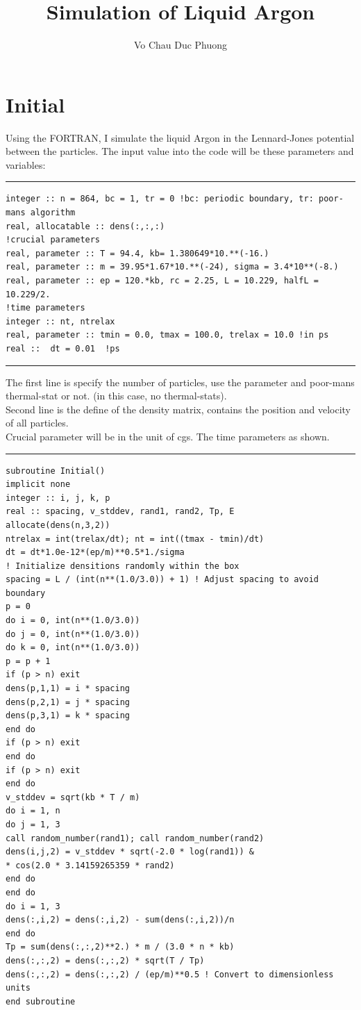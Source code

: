 \documentclass[a4paper]{article}
\author{Vo Chau Duc Phuong}
\title{Simulation of Liquid Argon}
\begin{document}
	\maketitle
\tableofcontents
\section{Initial}
\quad Using the FORTRAN, I simulate the liquid Argon in the Lennard-Jones potential between the particles. The input value into the code will be these parameters and variables:\\
\rule{\textwidth}{1pt}
{\small
 \begin{lstlisting}
integer :: n = 864, bc = 1, tr = 0 !bc: periodic boundary, tr: poor-mans algorithm
real, allocatable :: dens(:,:,:)
!crucial parameters
real, parameter :: T = 94.4, kb= 1.380649*10.**(-16.)
real, parameter :: m = 39.95*1.67*10.**(-24), sigma = 3.4*10**(-8.)
real, parameter :: ep = 120.*kb, rc = 2.25, L = 10.229, halfL = 10.229/2.
!time parameters
integer :: nt, ntrelax
real, parameter :: tmin = 0.0, tmax = 100.0, trelax = 10.0 !in ps
real ::  dt = 0.01  !ps
\end{lstlisting}}
\rule{\textwidth}{1pt}\null\vspace{0.5cm}
\normalsize\null
\quad The first line is specify the number of particles, use the parameter and poor-mans thermal-stat or not. (in this case, no thermal-stats).\\\null
\quad Second line is the define of the density matrix, contains the position and velocity of all particles.\\\null
\quad Crucial parameter will be in the unit of cgs. The time parameters as shown.\\
\rule{\textwidth}{1pt}
{\small
\begin{lstlisting}
subroutine Initial()
implicit none
integer :: i, j, k, p
real :: spacing, v_stddev, rand1, rand2, Tp, E
allocate(dens(n,3,2))
ntrelax = int(trelax/dt); nt = int((tmax - tmin)/dt)
dt = dt*1.0e-12*(ep/m)**0.5*1./sigma
! Initialize densitions randomly within the box
spacing = L / (int(n**(1.0/3.0)) + 1) ! Adjust spacing to avoid boundary
p = 0
do i = 0, int(n**(1.0/3.0))
do j = 0, int(n**(1.0/3.0))
do k = 0, int(n**(1.0/3.0))
p = p + 1
if (p > n) exit
dens(p,1,1) = i * spacing
dens(p,2,1) = j * spacing
dens(p,3,1) = k * spacing
end do
if (p > n) exit
end do
if (p > n) exit
end do
v_stddev = sqrt(kb * T / m)
do i = 1, n
do j = 1, 3
call random_number(rand1); call random_number(rand2)
dens(i,j,2) = v_stddev * sqrt(-2.0 * log(rand1)) &
* cos(2.0 * 3.14159265359 * rand2)
end do
end do
do i = 1, 3
dens(:,i,2) = dens(:,i,2) - sum(dens(:,i,2))/n
end do
Tp = sum(dens(:,:,2)**2.) * m / (3.0 * n * kb)
dens(:,:,2) = dens(:,:,2) * sqrt(T / Tp)
dens(:,:,2) = dens(:,:,2) / (ep/m)**0.5 ! Convert to dimensionless units
end subroutine
\end{lstlisting}}
\end{document}
